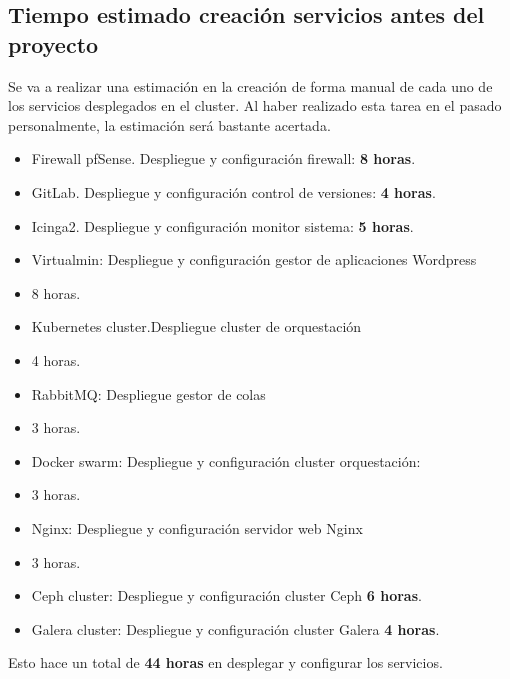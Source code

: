 \subsection{Tiempo estimado creación servicios antes del proyecto}
        \begin{text}
                Se va a realizar una estimación en la creación de forma manual de cada uno de los servicios desplegados en el cluster. Al haber realizado esta tarea en el pasado personalmente, la estimación será bastante acertada.
                \clearpage
                \begin{itemize}
                        \item Firewall pfSense. Despliegue y configuración firewall: \textbf{8 horas}.
                        \item GitLab. Despliegue y configuración control de versiones: \textbf{4 horas}.
                        \item Icinga2. Despliegue y configuración monitor sistema: \textbf{5 horas}.
                        \item Virtualmin: Despliegue y configuración gestor de aplicaciones Wordpress \item{8 horas}.
                        \item Kubernetes cluster.Despliegue cluster de orquestación \item{4 horas}.
                        \item RabbitMQ: Despliegue gestor de colas \item{3 horas}.
                        \item Docker swarm: Despliegue y configuración cluster orquestación: \item{3 horas}.
                        \item Nginx: Despliegue y configuración servidor web Nginx \item{3 horas}.
                        \item Ceph cluster: Despliegue y configuración cluster Ceph \textbf{6 horas}.
                        \item Galera cluster: Despliegue y configuración cluster Galera \textbf{4 horas}.
                \end{itemize}
        Esto hace un total de \textbf{44 horas} en desplegar y configurar los servicios.
        \end{text}

